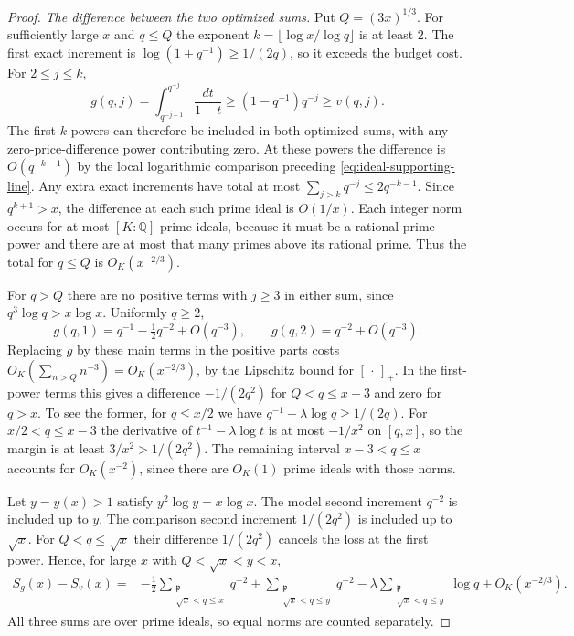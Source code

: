 \documentclass[11pt]{amsart}
\theoremstyle{definition}
\theoremstyle{remark}
\numberwithin{equation}{section}
\begin{document}
\begin{proof}
\emph{The difference between the two optimized sums.}
Put \(Q=(3x)^{1/3}\). For sufficiently large \(x\) and
\(q\le Q\) the exponent \(k=\lfloor\log x/\log q\rfloor\)
is at least \(2\). The first exact increment is
\(\log(1+q^{-1})\ge 1/(2q)\), so it exceeds the budget
cost. For \(2\le j\le k\),
\[
 g(q,j)=\int_{q^{-j-1}}^{q^{-j}}\frac{dt}{1-t}
       \ge (1-q^{-1})q^{-j}\ge v(q,j).
\]
The first \(k\) powers can therefore be included in both
optimized sums, with any zero-price-difference power
contributing zero. At these powers the difference is
\(O(q^{-k-1})\) by the local logarithmic comparison preceding
\eqref{eq:ideal-supporting-line}. Any extra exact increments
have total at most \(\sum_{j>k}q^{-j}\le2q^{-k-1}\).
Since \(q^{k+1}>x\), the difference at each such prime ideal
is \(O(1/x)\). Each integer norm occurs for at most
\([K:\mathbb Q]\) prime ideals, because it must be a rational
prime power and there are at most that many primes above its
rational prime. Thus the total for \(q\le Q\) is \(O_K(x^{-2/3})\).

For \(q>Q\) there are no positive terms with \(j\ge3\)
in either sum, since \(q^3\log q>x\log x\). Uniformly \(q\ge2\),
\[
 g(q,1)=q^{-1}-\tfrac12 q^{-2}+O(q^{-3}),\qquad
 g(q,2)=q^{-2}+O(q^{-3}).
\]
Replacing \(g\) by these main terms in the positive parts
costs \(O_K(\sum_{n>Q}n^{-3})=O_K(x^{-2/3})\), by the
Lipschitz bound for \([\,\cdot\,]_+\).
In the first-power terms this gives a difference
\(-1/(2q^2)\) for \(Q<q\le x-3\) and zero for \(q>x\).
To see the former, for \(q\le x/2\) we have
\(q^{-1}-\lambda\log q\ge1/(2q)\). For \(x/2<q\le x-3\)
the derivative of \(t^{-1}-\lambda\log t\) is at most
\(-1/x^2\) on \([q,x]\), so the margin is at least
\(3/x^2>1/(2q^2)\). The remaining interval \(x-3<q\le x\)
accounts for \(O_K(x^{-2})\), since there are \(O_K(1)\)
prime ideals with those norms.

Let \(y=y(x)>1\) satisfy \(y^2\log y=x\log x\).
The model second increment \(q^{-2}\) is included up to \(y\).
The comparison second increment \(1/(2q^2)\) is included
up to \(\sqrt{x}\). For \(Q<q\le\sqrt{x}\) their difference
\(1/(2q^2)\) cancels the loss at the first power. Hence,
for large \(x\) with \(Q<\sqrt{x}<y<x\),
\begin{align}
 S_g(x)-S_v(x)={}&
 -\frac12\sum_{\substack{\mathfrak p\\ \sqrt{x}<q\le x}} q^{-2}
 +\sum_{\substack{\mathfrak p\\ \sqrt{x}<q\le y}} q^{-2}
 -\lambda\sum_{\substack{\mathfrak p\\ \sqrt{x}<q\le y}}\log q
 +O_K(x^{-2/3}).
 \label{eq:sharp-price-difference}
\end{align}
All three sums are over prime ideals, so equal norms
are counted separately.


\end{proof}
\end{document}
